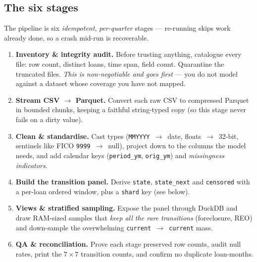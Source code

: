 \documentclass[11pt]{article}
\begin{document}
\subsection{The six stages}

The pipeline is six \emph{idempotent}, \emph{per-quarter} stages --- re-running skips work
already done, so a crash mid-run is recoverable.

\begin{enumerate}[leftmargin=1.6em, itemsep=4pt]
  \item \textbf{Inventory \& integrity audit.} Before trusting anything, catalogue every
        file: row count, distinct loans, time span, field count. Quarantine the truncated
        files. \emph{This is non-negotiable and goes first} --- you do not model against
        a dataset whose coverage you have not mapped.
  \item \textbf{Stream CSV $\to$ Parquet.} Convert each raw CSV to compressed Parquet in
        bounded chunks, keeping a faithful string-typed copy (so this stage never fails on
        a dirty value).
  \item \textbf{Clean \& standardise.} Cast types (\texttt{MMYYYY}~$\to$~date,
        floats~$\to$~32-bit, sentinels like FICO \texttt{9999}~$\to$~null), project down
        to the columns the model needs, and add calendar keys (\texttt{period\_ym},
        \texttt{orig\_ym}) and \emph{missingness indicators}.
  \item \textbf{Build the transition panel.} Derive \texttt{state}, \texttt{state\_next}
        and \texttt{censored} with a per-loan ordered window, plus a \texttt{shard} key
        (see below).
  \item \textbf{Views \& stratified sampling.} Expose the panel through DuckDB and draw
        RAM-sized samples that \emph{keep all the rare transitions} (foreclosure, REO) and
        down-sample the overwhelming \texttt{current}~$\to$~\texttt{current} mass.
  \item \textbf{QA \& reconciliation.} Prove each stage preserved row counts, audit null
        rates, print the $7\times 7$ transition counts, and confirm no duplicate
        loan-months.
\end{enumerate}
\end{document}
